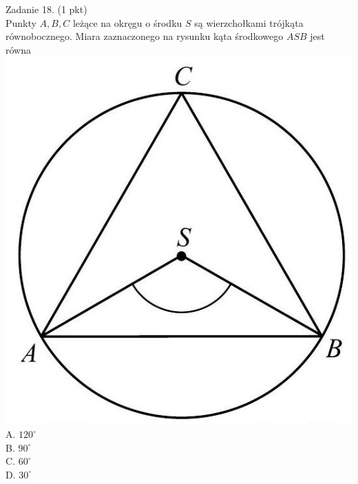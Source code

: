 \documentclass[10pt]{article}
\begin{document}
Zadanie 18. (1 pkt)\\
Punkty \(A, B, C\) leżące na okręgu o środku \(S\) są wierzchołkami trójkąta równobocznego. Miara zaznaczonego na rysunku kąta środkowego \(A S B\) jest równa\\
\includegraphics[max width=\textwidth, center]{2024_11_21_caf6b2e64dd65c9b24eeg-06}\\
A. \(120^{\circ}\)\\
B. \(90^{\circ}\)\\
C. \(60^{\circ}\)\\
D. \(30^{\circ}\)
\end{document}
